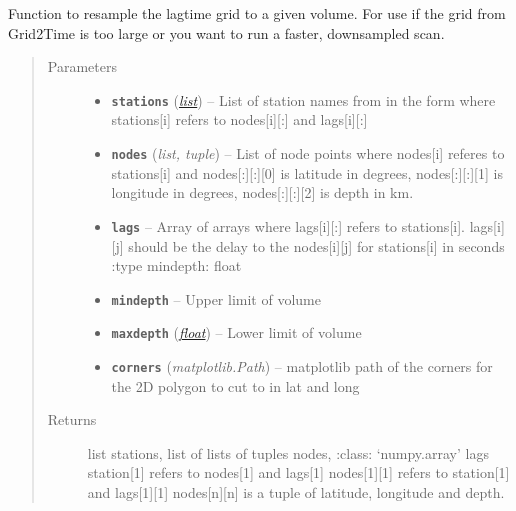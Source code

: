 \documentclass[a4paper,10pt,english]{sphinxmanual}
\begin{document}
\begin{fulllineitems}
\label{core:bright_lights._resample_grid}
Function to resample the lagtime grid to a given volume.  For use if the
grid from Grid2Time is too large or you want to run a faster, downsampled
scan.
\begin{quote}\begin{description}
\item[{Parameters}] \leavevmode\begin{itemize}
\item {} 
\textbf{\texttt{stations}} (\href{https://docs.python.org/library/functions.html\#list}{\emph{list}}) -- List of station names from in the form where stations{[}i{]}    refers to nodes{[}i{]}{[}:{]} and lags{[}i{]}{[}:{]}

\item {} 
\textbf{\texttt{nodes}} (\emph{list, tuple}) -- List of node points where nodes{[}i{]} referes to stations{[}i{]} and    nodes{[}:{]}{[}:{]}{[}0{]} is latitude in degrees, nodes{[}:{]}{[}:{]}{[}1{]} is longitude in    degrees, nodes{[}:{]}{[}:{]}{[}2{]} is depth in km.

\item {} 
\textbf{\texttt{lags}} -- Array of arrays where lags{[}i{]}{[}:{]} refers to stations{[}i{]}.    lags{[}i{]}{[}j{]} should be the delay to the nodes{[}i{]}{[}j{]} for stations{[}i{]} in seconds    :type mindepth: float

\item {} 
\textbf{\texttt{mindepth}} -- Upper limit of volume

\item {} 
\textbf{\texttt{maxdepth}} (\href{https://docs.python.org/library/functions.html\#float}{\emph{float}}) -- Lower limit of volume

\item {} 
\textbf{\texttt{corners}} (\emph{matplotlib.Path}) -- matplotlib path of the corners for the 2D polygon to cut to    in lat and long

\end{itemize}

\item[{Returns}] \leavevmode
list stations, list of lists of tuples nodes, :class:     `numpy.array' lags station{[}1{]} refers to nodes{[}1{]} and lags{[}1{]}    nodes{[}1{]}{[}1{]} refers to station{[}1{]} and lags{[}1{]}{[}1{]}    nodes{[}n{]}{[}n{]} is a tuple of latitude, longitude and depth.

\end{description}\end{quote}

\end{fulllineitems}
\end{document}
